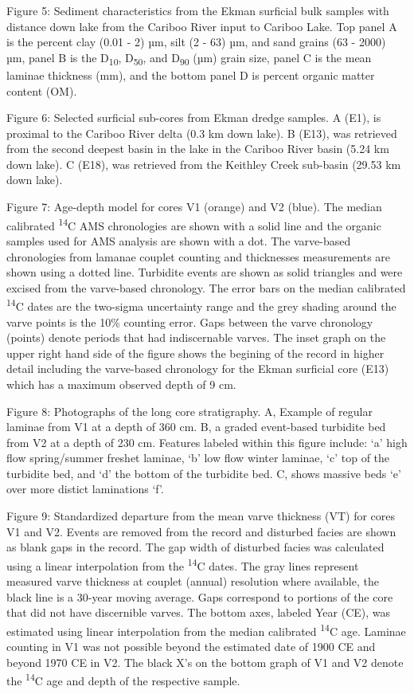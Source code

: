 \documentclass[
  letterpaper,
  DIV=11,
  numbers=noendperiod]{scrartcl}
\begin{document}
Figure 5: Sediment characteristics from the Ekman surficial bulk samples
with distance down lake from the Cariboo River input to Cariboo Lake.
Top panel A is the percent clay (0.01 - 2) µm, silt (2 - 63) µm, and
sand grains (63 - 2000) µm, panel B is the D\textsubscript{10},
D\textsubscript{50}, and D\textsubscript{90} (µm) grain size, panel C is
the mean laminae thickness (mm), and the bottom panel D is percent
organic matter content (OM).

Figure 6: Selected surficial sub-cores from Ekman dredge samples. A
(E1), is proximal to the Cariboo River delta (0.3 km down lake). B
(E13), was retrieved from the second deepest basin in the lake in the
Cariboo River basin (5.24 km down lake). C (E18), was retrieved from the
Keithley Creek sub-basin (29.53 km down lake).

Figure 7: Age-depth model for cores V1 (orange) and V2 (blue). The
median calibrated \textsuperscript{14}C AMS chronologies are shown with
a solid line and the organic samples used for AMS analysis are shown
with a dot. The varve-based chronologies from lamanae couplet counting
and thicknesses measurements are shown using a dotted line. Turbidite
events are shown as solid triangles and were excised from the
varve-based chronology. The error bars on the median calibrated
\textsuperscript{14}C dates are the two-sigma uncertainty range and the
grey shading around the varve points is the 10\% counting error. Gaps
between the varve chronology (points) denote periods that had
indiscernable varves. The inset graph on the upper right hand side of
the figure shows the begining of the record in higher detail including
the varve-based chronology for the Ekman surficial core (E13) which has
a maximum observed depth of 9 cm.

Figure 8: Photographs of the long core stratigraphy. A, Example of
regular laminae from V1 at a depth of 360 cm. B, a graded event-based
turbidite bed from V2 at a depth of 230 cm. Features labeled within this
figure include: `a' high flow spring/summer freshet laminae, `b' low
flow winter laminae, `c' top of the turbidite bed, and `d' the bottom of
the turbidite bed. C, shows massive beds `e' over more distict
laminations `f'.

Figure 9: Standardized departure from the mean varve thickness (VT) for
cores V1 and V2. Events are removed from the record and disturbed facies
are shown as blank gaps in the record. The gap width of disturbed facies
was calculated using a linear interpolation from the
\textsuperscript{14}C dates. The gray lines represent measured varve
thickness at couplet (annual) resolution where available, the black line
is a 30-year moving average. Gaps correspond to portions of the core
that did not have discernible varves. The bottom axes, labeled Year
(CE), was estimated using linear interpolation from the median
calibrated \textsuperscript{14}C age. Laminae counting in V1 was not
possible beyond the estimated date of 1900 CE and beyond 1970 CE in V2.
The black X's on the bottom graph of V1 and V2 denote the
\textsuperscript{14}C age and depth of the respective sample.
\end{document}
